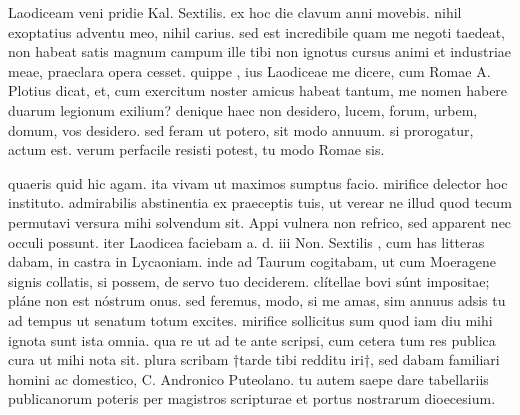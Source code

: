 


 Laodiceam veni pridie Kal. Sextilis. ex hoc die clavum anni movebis. nihil exoptatius adventu meo, nihil carius. sed est incredibile quam me negoti taedeat, non habeat satis magnum campum ille tibi non ignotus cursus animi et industriae meae, praeclara opera cesset. quippe , ius Laodiceae me dicere, cum Romae A. Plotius dicat, et, cum exercitum noster amicus habeat tantum, me nomen habere duarum legionum exilium? denique haec non desidero, lucem, forum, urbem, domum, vos desidero. sed feram ut potero, sit modo annuum. si prorogatur, actum est. verum perfacile resisti potest, tu modo Romae sis.

 quaeris quid hic agam. ita vivam ut maximos sumptus facio. mirifice delector hoc instituto. admirabilis abstinentia ex praeceptis tuis, ut verear ne illud quod tecum permutavi versura mihi solvendum sit. Appi vulnera non refrico, sed apparent nec occuli possunt. iter Laodicea faciebam a. d. iii Non. Sextilis , cum has litteras dabam, in castra in Lycaoniam. inde ad Taurum cogitabam, ut cum Moeragene signis collatis, si possem, de servo tuo deciderem. clítellae bovi súnt impositae; pláne non est nóstrum onus. sed feremus, modo, si me amas, sim annuus adsis tu ad tempus ut senatum totum excites. mirifice sollicitus sum quod iam diu mihi ignota sunt ista omnia. qua re ut ad te ante scripsi, cum cetera tum res publica cura ut mihi nota sit. plura scribam †tarde tibi redditu iri†, sed dabam familiari homini ac domestico, C. Andronico Puteolano. tu autem saepe dare tabellariis publicanorum poteris per magistros scripturae et portus nostrarum dioecesium.
